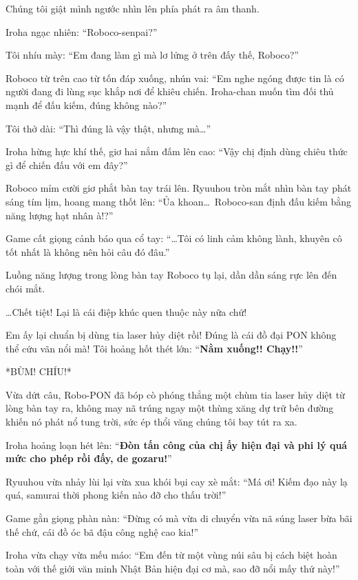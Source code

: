 \documentclass[../main.tex]{subfiles}
\begin{document}
Chúng tôi giật mình ngước nhìn lên phía phát ra âm thanh.

Iroha ngạc nhiên: ``Roboco-senpai?''

Tôi nhíu mày: ``Em đang làm gì mà lơ lửng ở trên đấy thế, Roboco?''

Roboco từ trên cao từ tốn đáp xuống, nhún vai: ``Em nghe ngóng được tin là có người đang đi lùng sục khắp nơi để khiêu chiến. Iroha-chan muốn tìm đối thủ mạnh để đấu kiếm, đúng không nào?''

Tôi thở dài: ``Thì đúng là vậy thật, nhưng mà\dots''

Iroha hừng hực khí thế, giơ hai nắm đấm lên cao: ``Vậy chị định dùng chiêu thức gì để chiến đấu với em đây?''

Roboco mỉm cười giơ phắt bàn tay trái lên. Ryuuhou tròn mắt nhìn bàn tay phát sáng tím lịm, hoang mang thốt lên: ``Ủa khoan\dots\ Roboco-san định đấu kiếm bằng năng lượng hạt nhân à!?''

Game cất giọng cảnh báo qua cổ tay: ``\dots Tôi có linh cảm không lành, khuyên cô tốt nhất là không nên hỏi câu đó đâu.''

Luồng năng lượng trong lòng bàn tay Roboco tụ lại, dần dần sáng rực lên đến chói mắt.


\dots Chết tiệt! Lại là cái điệp khúc quen thuộc này nữa chứ!

Em ấy lại chuẩn bị dùng tia laser hủy diệt rồi! Đúng là cái đồ đại PON không thể cứu vãn nổi mà! Tôi hoảng hốt thét lớn: ``\textbf{Nằm xuống!! Chạy!!}''

*BÙM! CHÍU!*

Vừa dứt câu, Robo-PON đã bóp cò phóng thẳng một chùm tia laser hủy diệt từ lòng bàn tay ra, không may nã trúng ngay một thùng xăng dự trữ bên đường khiến nó phát nổ tung trời, sức ép thổi văng chúng tôi bay tút ra xa.

Iroha hoảng loạn hét lên: ``\textbf{Đòn tấn công của chị ấy hiện đại và phi lý quá mức cho phép rồi đấy, de gozaru!}''

Ryuuhou vừa nhảy lùi lại vừa xua khói bụi cay xè mắt: ``Má ơi! Kiếm đạo này lạ quá, samurai thời phong kiến nào đỡ cho thấu trời!''

Game gằn giọng phàn nàn: ``Đừng có mà vừa di chuyển vừa nã súng laser bừa bãi thế chứ, cái đồ óc bã đậu công nghệ cao kia!''

Iroha vừa chạy vừa mếu máo: ``Em đến từ một vùng núi sâu bị cách biệt hoàn toàn với thế giới văn minh Nhật Bản hiện đại cơ mà, sao đỡ nổi mấy thứ này!''
\end{document}
